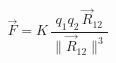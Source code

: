 \documentclass[preview]{standalone}
\begin{document}
\begin{align*}
\vec{F} = K \, \dfrac{q_1 q_2 \, \vec{R}_{12}}{\lVert \vec{R}_{12} \rVert^3}
\end{align*}
\end{document}
